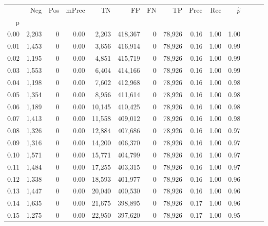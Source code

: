 \begin{tabular}{rrrrrrrrrrrrrr}
\toprule
{} &     Neg &    Pos & mPrec &       TN &       FP &      FN &      TP &  Prec &   Rec & $\hat{p}$ \\
p    &         &        &       &          &          &         &         &       &       &           \\
\midrule
0.00 &   2,203 &      0 &  0.00 &    2,203 &  418,367 &       0 &  78,926 &  0.16 &  1.00 &      1.00 \\
0.01 &   1,453 &      0 &  0.00 &    3,656 &  416,914 &       0 &  78,926 &  0.16 &  1.00 &      0.99 \\
0.02 &   1,195 &      0 &  0.00 &    4,851 &  415,719 &       0 &  78,926 &  0.16 &  1.00 &      0.99 \\
0.03 &   1,553 &      0 &  0.00 &    6,404 &  414,166 &       0 &  78,926 &  0.16 &  1.00 &      0.99 \\
0.04 &   1,198 &      0 &  0.00 &    7,602 &  412,968 &       0 &  78,926 &  0.16 &  1.00 &      0.98 \\
0.05 &   1,354 &      0 &  0.00 &    8,956 &  411,614 &       0 &  78,926 &  0.16 &  1.00 &      0.98 \\
0.06 &   1,189 &      0 &  0.00 &   10,145 &  410,425 &       0 &  78,926 &  0.16 &  1.00 &      0.98 \\
0.07 &   1,413 &      0 &  0.00 &   11,558 &  409,012 &       0 &  78,926 &  0.16 &  1.00 &      0.98 \\
0.08 &   1,326 &      0 &  0.00 &   12,884 &  407,686 &       0 &  78,926 &  0.16 &  1.00 &      0.97 \\
0.09 &   1,316 &      0 &  0.00 &   14,200 &  406,370 &       0 &  78,926 &  0.16 &  1.00 &      0.97 \\
0.10 &   1,571 &      0 &  0.00 &   15,771 &  404,799 &       0 &  78,926 &  0.16 &  1.00 &      0.97 \\
0.11 &   1,484 &      0 &  0.00 &   17,255 &  403,315 &       0 &  78,926 &  0.16 &  1.00 &      0.97 \\
0.12 &   1,338 &      0 &  0.00 &   18,593 &  401,977 &       0 &  78,926 &  0.16 &  1.00 &      0.96 \\
0.13 &   1,447 &      0 &  0.00 &   20,040 &  400,530 &       0 &  78,926 &  0.16 &  1.00 &      0.96 \\
0.14 &   1,635 &      0 &  0.00 &   21,675 &  398,895 &       0 &  78,926 &  0.17 &  1.00 &      0.96 \\
0.15 &   1,275 &      0 &  0.00 &   22,950 &  397,620 &       0 &  78,926 &  0.17 &  1.00 &      0.95 \\

\end{tabular}
